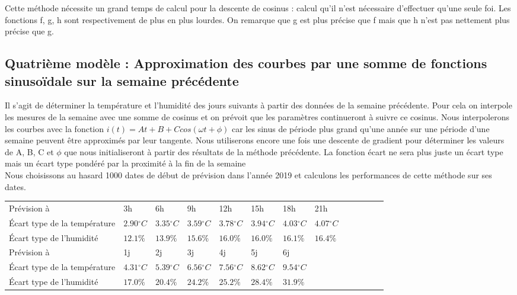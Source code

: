 \documentclass[11pt,a4paper]{article}
\begin{document}
Cette méthode nécessite un grand temps de calcul pour la descente de cosinus : calcul qu'il n'est nécessaire d'effectuer qu'une seule foi. Les fonctions f, g, h sont respectivement de plus en plus lourdes. On remarque que g est plus précise que f mais que h n'est pas nettement plus précise que g.



\subsection {Quatrième modèle : Approximation des courbes par une somme de fonctions sinusoïdale sur la semaine précédente }
Il s'agit de déterminer la température et l'humidité des jours suivants à partir des données de la semaine précédente. Pour cela on interpole les mesures de la semaine avec une somme de cosinus et on prévoit que les paramètres continueront à suivre ce cosinus. Nous interpolerons les courbes avec la fonction $i(t) = At + B + C cos  (\omega t + \phi)$  car les sinus de période plus grand qu'une année sur une période d'une semaine peuvent être approximés par leur tangente. Nous utiliserons encore une fois une descente de gradient pour déterminer les valeurs de A, B, C et $\phi$ que nous initialiseront à partir des résultats de la méthode précédente. La fonction écart ne sera plus juste un écart type mais un écart type pondéré par la proximité à la fin de la semaine \\
Nous choisissons au hasard 1000 dates de début de prévision dans l'année 2019 et calculons les performances de cette méthode sur ses dates.\\

\begin{tabular}{lllllllllllll}\hline
\hline
Prévision à                  &3h                         &6h                        &9h                           &12h                         &15h                          &18h          &         21h      \\
Écart type de la température& $2.90{}^{\circ}C$& $3.35{}^{\circ}C$& $3.59{}^{\circ}C$& $3.78{}^{\circ}C$& $3.94{}^{\circ}C$& $4.03{}^{\circ}C$&$4.07{}^{\circ}C$\\
Écart type de l'humidité &$12.1\%$ & $13.9\%$ & $15.6\%$ & $16.0\%$ & $16.0\%$ & $16.1\%$ & $16.4\%$  \\
\hline
Prévision à                  & 1j &           2j            &3j            &4j          &5j            & 6j & \\
Écart type de la température&$4.31{}^{\circ}C$&$5.39{}^{\circ}C$&$6.56{}^{\circ}C$&$7.56{}^{\circ}C$&$8.62{}^{\circ}C$&$9.54{}^{\circ}C$ \\
Écart type de l'humidité      & $17.0\%$ &  $ 20.4\% $         &  $ 24.2\% $         &  $ 25.2\% $        &  $ 28.4\% $         &  $ 31.9\% $  \\
\hline 
\end{tabular}
	
\end{document}
